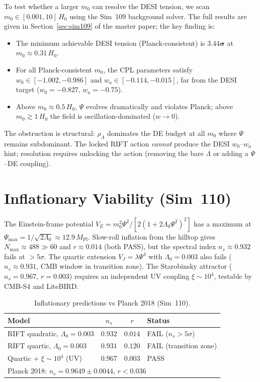 \documentclass[12pt,a4paper]{article}
\begin{document}
To test whether a larger $m_0$ can resolve the DESI tension, we scan
$m_0\in[0.001,10]\,H_0$ using the Sim~109 background solver.  The full
results are given in Section~\ref{sec:sim109} of the master paper; the
key finding is:
\begin{itemize}
  \item The minimum achievable DESI tension (Planck-consistent) is
    $\mathbf{3.44\sigma}$ at $m_0\approx0.31\,H_0$.
  \item For all Planck-consistent $m_0$, the CPL parameters satisfy
    $w_0\in[-1.002,-0.986]$ and $w_a\in[-0.114,-0.015]$, far from the DESI
    target ($w_0=-0.827$, $w_a=-0.75$).
  \item Above $m_0\approx 0.5\,H_0$, $\Psi$ evolves dramatically and
    violates Planck; above $m_0\gtrsim 1\,H_0$ the field is
    oscillation-dominated ($w\to 0$).
\end{itemize}
The obstruction is structural: $\rho_\Lambda$ dominates the DE budget
at all $m_0$ where $\Psi$ remains subdominant.  The locked RIFT action
\emph{cannot} produce the DESI $w_0$--$w_a$ hint; resolution requires
unlocking the action (removing the bare $\Lambda$ or adding a
$\Psi$--DE coupling).

\section{Inflationary Viability (Sim~110)}
\label{sec:sim110}

The Einstein-frame potential $V_E=m_0^2\Psi^2/[2(1+2\Lambda_0\Psi^2)^2]$ has a maximum
at $\Psi_\mathrm{max}=1/\sqrt{2\Lambda_0}\approx12.9\,M_\mathrm{Pl}$.
Slow-roll inflation from the hilltop gives $N_\mathrm{max}\approx488\gg60$ and
$r\approx0.014$ (both PASS), but the spectral index $n_s\approx0.932$ fails at
$>5\sigma$.  The quartic extension $V_J=\lambda\Psi^4$ with $\Lambda_0=0.003$ also
fails ($n_s\approx0.931$, CMB window in transition zone).  The Starobinsky attractor
($n_s=0.967$, $r=0.003$) requires an independent UV coupling $\xi\sim10^4$,
testable by CMB-S4 and LiteBIRD.

\begin{table}[h]
\centering
\caption{Inflationary predictions vs Planck 2018 (Sim~110).}
\begin{tabular}{lccl}
\hline
Model & $n_s$ & $r$ & Status \\
\hline
RIFT quadratic, $\Lambda_0=0.003$ & $0.932$ & $0.014$ & FAIL ($n_s>5\sigma$) \\
RIFT quartic, $\Lambda_0=0.003$   & $0.931$ & $0.120$ & FAIL (transition zone) \\
Quartic $+$ $\xi\sim10^4$ (UV)    & $0.967$ & $0.003$ & PASS \\
\hline
\multicolumn{4}{l}{Planck 2018: $n_s=0.9649\pm0.0044$, $r<0.036$} \\
\hline
\end{tabular}
\end{table}
\end{document}
